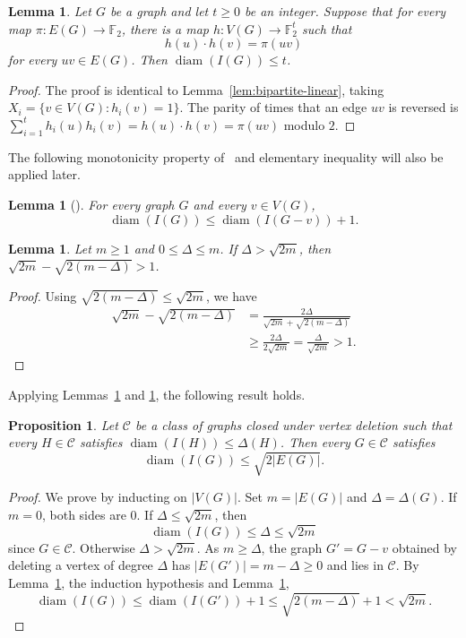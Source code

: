 \documentclass[11pt]{article}
\newtheorem{proposition}[theorem]{Proposition}
\newtheorem{lemma}[theorem]{Lemma}
\theoremstyle{remark}
\DeclareMathOperator{\diam}{diam}
\newcommand{\F}{\mathbb{F}}
\begin{document}
\begin{lemma}\label{lem:graph-linear}
Let $G$ be a graph and let $t\ge0$ be an integer.
Suppose that for every map $\pi:E(G)\to\F_2$, there is a map
$h:V(G)\to\F_2^t$ such that
\[
  h(u)\cdot h(v)=\pi(uv)
\]
for every $uv\in E(G)$.
Then $\diam(I(G))\le t$.
\end{lemma}

\begin{proof}
The proof is identical to Lemma~\ref{lem:bipartite-linear}, taking
$X_i=\{v\in V(G):h_i(v)=1\}$.
The parity of times that an edge $uv$ is reversed is 
$\sum_{i=1}^t h_i(u)h_i(v)=h(u)\cdot h(v)=\pi(uv)$ modulo $2$.
\end{proof}
  

The following monotonicity property of~\cite{HavetHorschRambaud} and  elementary inequality will also be applied later.

\begin{lemma}[{\cite[Lemma~2.1]{HavetHorschRambaud}}]\label{lem:vertex-deletion}
For every graph $G$ and every $v\in V(G)$,
\[
  \diam(I(G))\le \diam(I(G-v))+1.
\]
\end{lemma}

\begin{lemma}\label{lem:sqrt-inequality}
Let $m\ge1$ and $0\le\Delta\le m$.
If $\Delta>\sqrt{2m}$, then $\sqrt{2m}-\sqrt{2(m-\Delta)}>1$.
 
\end{lemma}

\begin{proof}
Using $\sqrt{2(m-\Delta)}\le\sqrt{2m}$, we have 
\[
\begin{aligned}
\sqrt{2m}-\sqrt{2(m-\Delta)}
  &=\frac{2\Delta}{\sqrt{2m}+\sqrt{2(m-\Delta)}}  \\
  &\ge \frac{2\Delta}{2\sqrt{2m}}
   =\frac{\Delta}{\sqrt{2m}}>1.
\end{aligned}
\]
\end{proof}

Applying Lemmas~\ref{lem:vertex-deletion} and \ref{lem:sqrt-inequality}, the following result holds.  
\begin{proposition}\label{prop:hereditary-sqrt2}
Let $\mathcal C$ be a class of graphs closed under vertex deletion such that every $H\in\mathcal C$ satisfies
$\diam(I(H))\le\Delta(H)$.
Then every $G\in\mathcal C$ satisfies
\[
  \diam(I(G))\le\sqrt{2|E(G)|}.
\]
\end{proposition}

\begin{proof}
We prove by inducting on $|V(G)|$. Set  $m=|E(G)|$ and $\Delta=\Delta(G)$.
If $m=0$, both sides are $0$.
If $\Delta\le\sqrt{2m}$, then
\[
  \diam(I(G))\le\Delta\le\sqrt{2m}
\]
since $G\in\mathcal C$.
Otherwise $\Delta>\sqrt{2m}$.
As $m\ge\Delta$, the graph $G'=G-v$ obtained by deleting a vertex of degree $\Delta$ has
$|E(G')|=m-\Delta\ge0$ and lies in $\mathcal C$.
By Lemma~\ref{lem:vertex-deletion}, the induction hypothesis and Lemma~\ref{lem:sqrt-inequality},
\[
  \diam(I(G))\le \diam(I(G'))+1
  \le \sqrt{2(m-\Delta)}+1<\sqrt{2m}.
\]
\end{proof}
\end{document}
